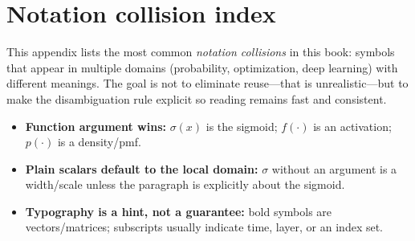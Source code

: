 \section{Notation collision index}\label{app:notation_collisions}

This appendix lists the most common \emph{notation collisions} in this book: symbols that appear in multiple domains (probability, optimization, deep learning) with different meanings. The goal is not to eliminate reuse---that is unrealistic---but to make the disambiguation rule explicit so reading remains fast and consistent.

\begin{tcolorbox}[summarybox, title={Disambiguation rule (used throughout the book)}]
\begin{itemize}
    \item \textbf{Function argument wins:} \(\sigma(x)\) is the sigmoid; \(f(\cdot)\) is an activation; \(p(\cdot)\) is a density/pmf.
    \item \textbf{Plain scalars default to the local domain:} \(\sigma\) without an argument is a width/scale unless the paragraph is explicitly about the sigmoid.
    \item \textbf{Typography is a hint, not a guarantee:} bold symbols are vectors/matrices; subscripts usually indicate time, layer, or an index set.
\end{itemize}
\end{tcolorbox}

